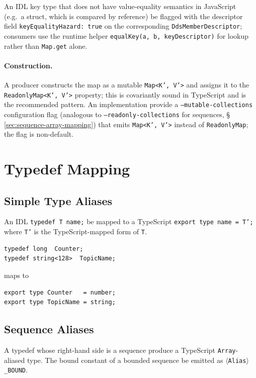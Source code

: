 \documentclass{../styles/zerodds-vendor-spec}
\begin{document}
An IDL key type that does not have value-equality semantics in
JavaScript (e.g.\ a struct, which is compared by reference)
 be flagged with the descriptor field
\texttt{keyEqualityHazard:\,true} on the corresponding
\texttt{DdsMemberDescriptor}; consumers  use the
runtime helper \texttt{equalKey(a,\,b,\,keyDescriptor)} for
lookup rather than \texttt{Map.get} alone.

\paragraph{Construction.} A producer constructs the map as a
mutable \texttt{Map<K',\,V'>} and assigns it to the
\texttt{ReadonlyMap<K',\,V'>} property; this is covariantly
sound in TypeScript and is the recommended pattern. An
implementation  provide a
\texttt{--mutable-collections} configuration flag (analogous to
\texttt{--readonly-collections} for sequences,
\S\,\ref{sec:sequence-array-mapping}) that emits
\texttt{Map<K',\,V'>} instead of \texttt{ReadonlyMap}; the flag
is non-default.

\section{Typedef Mapping}\label{sec:typedef-mapping}

\subsection{Simple Type Aliases}

An IDL \texttt{typedef T name;}  be mapped to a
TypeScript \texttt{export type name = T';} where \texttt{T'} is
the TypeScript-mapped form of \texttt{T}.

\begin{specexample}
\begin{lstlisting}
typedef long  Counter;
typedef string<128>  TopicName;
\end{lstlisting}
maps to
\begin{lstlisting}
export type Counter   = number;
export type TopicName = string;
\end{lstlisting}
\end{specexample}

\subsection{Sequence Aliases}

A typedef whose right-hand side is a sequence  produce
a TypeScript \texttt{Array}-aliased type. The bound constant of a
bounded sequence  be emitted as
\texttt{$\langle$Alias$\rangle$\_BOUND}.
\end{document}
